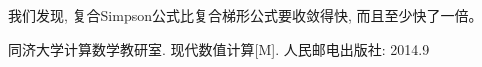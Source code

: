 \documentclass[10pt]{SelfArx} %
\numberwithin{dummy}{section}
\begin{document}
我们发现, 复合Simpson公式比复合梯形公式要收敛得快, 而且至少快了一倍。


\begin{thebibliography}{}
	
	 同济大学计算数学教研室. 现代数值计算[M]. 人民邮电出版社: 2014.9
\end{thebibliography}
\end{document}

